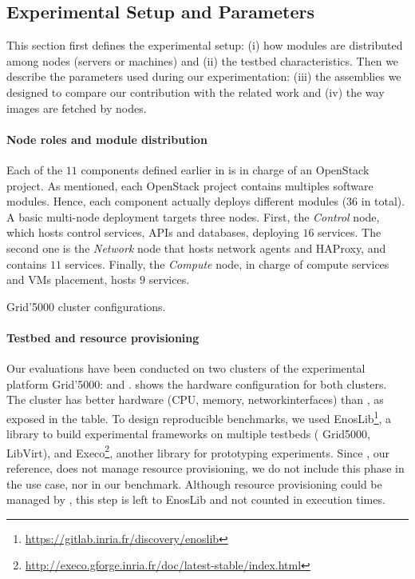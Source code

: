 \subsection{Experimental Setup and Parameters}

This section first defines the experimental setup: (i) how modules are
distributed among nodes (\ie servers or machines) and (ii) the testbed
characteristics. Then we describe the parameters used during
our experimentation: (iii) the assemblies we designed to compare our
contribution with the related work and (iv) the way \docker images are
fetched by nodes.

\paragraph{Node roles and module distribution}
Each of the $11$ components defined earlier in \kolla is in charge of
an OpenStack project. As mentioned, each OpenStack project
contains multiples software modules. Hence, each component actually
deploys different modules ($36$ in total). A basic multi-node \kolla
deployment targets three nodes. First, the \emph{Control} node, which
hosts control services, APIs and databases, deploying $16$
services. The second one is the \emph{Network} node that hosts network
agents and HAProxy, and contains $11$ services. Finally, the
\emph{Compute} node, in charge of compute services and VMs placement,
hosts $9$ services.

\begin{table}
  \begin{center}
    \small
    
    \caption{Grid'5000 cluster configurations.}
    \label{tab:g5k}
  \end{center}
\end{table}

\paragraph{Testbed and resource provisioning}
Our evaluations have been conducted on two clusters of the
experimental platform Grid'5000: \ecotype and \nova. 
shows the hardware configuration for both clusters. The cluster
\ecotype has better hardware (CPU, memory, networkinterfaces) than \nova,
as exposed in the table. To design reproducible benchmarks, we used
EnosLib\footnote{\url{https://gitlab.inria.fr/discovery/enoslib}}, a
library to build experimental frameworks on multiple testbeds (\eg
Grid5000, LibVirt), and
Execo\footnote{\url{http://execo.gforge.inria.fr/doc/latest-stable/index.html}},
another library for prototyping experiments. Since \kolla, our
reference, does not manage resource provisioning, we do not include
this phase in the use case, nor in our benchmark. Although resource
provisioning could be managed by \mad, this step is left to EnosLib
and not counted in execution times.

